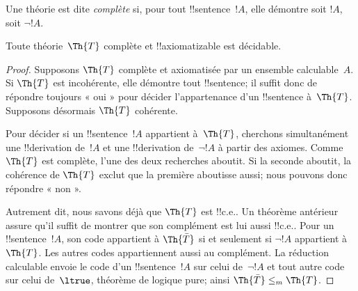 \documentclass[../../../include/open-logic-section]{subfiles}
\begin{document}


Une théorie est dite \emph{complète} si, pour tout
!!{sentence}~$!A$, elle démontre soit $!A$, soit
$\lnot !A$.

\begin{lem}
Toute théorie~$\Th{T}$ complète et !!{axiomatizable}
est décidable.
\end{lem}

\begin{proof}
Supposons $\Th{T}$ complète et axiomatisée par un
ensemble calculable~$A$. Si $\Th{T}$ est incohérente,
elle démontre tout !!{sentence}; il suffit donc de
répondre toujours « oui » pour décider l'appartenance
d'un !!{sentence} à~$\Th{T}$. Supposons désormais
$\Th{T}$ cohérente.

Pour décider si un !!{sentence}~$!A$ appartient
à~$\Th{T}$, cherchons simultanément une
!!{derivation} de~$!A$ et une
!!{derivation} de~$\lnot !A$ à partir des axiomes.
Comme $\Th{T}$ est complète, l'une des deux
recherches aboutit. Si la seconde aboutit, la
cohérence de $\Th{T}$ exclut que la première
aboutisse aussi; nous pouvons donc répondre « non ».

Autrement dit, nous savons déjà que $\Th{T}$ est
!!{c.e.}. Un théorème antérieur assure qu'il
suffit de montrer que son complément est lui aussi
!!{c.e.}. Pour un !!{sentence}~$!A$, son code appartient à
$\Th{\bar T}$ si et seulement si $\lnot !A$ appartient à~$\Th{T}$.
Les autres codes appartiennent aussi au complément. La réduction calculable
envoie le code d'un !!{sentence}~$!A$ sur celui de~$\lnot !A$ et tout autre code
sur celui de~$\ltrue$, théorème de logique pure; ainsi $\Th{\bar T}\leq_m\Th{T}$.
\end{proof}
\end{document}

